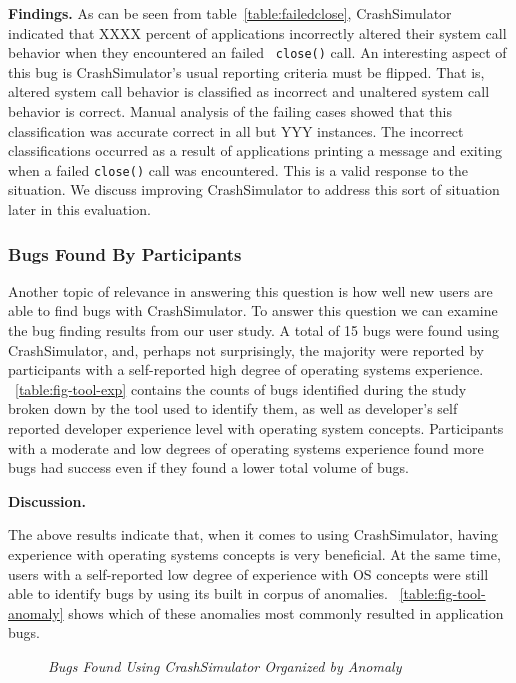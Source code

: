 {\bf Findings.} As can be seen from table~\ref{table:failedclose},
CrashSimulator indicated that XXXX percent of applications incorrectly
altered their system call behavior when they encountered an failed {\tt
close()} call.  An interesting aspect of this bug is CrashSimulator's usual
reporting criteria must be flipped.  That is, altered system call behavior
is classified as incorrect and unaltered system call behavior is correct.
Manual analysis of the failing cases showed that this classification was
accurate correct in all but YYY instances.  The incorrect classifications
occurred as a result of applications printing a message and exiting when a
failed {\tt close()} call was encountered.  This is a valid response to the
situation.  We discuss improving CrashSimulator to address this sort of
situation later in this evaluation.

\subsubsection{Bugs Found By Participants}

Another topic of relevance in answering this question is how well new users are
able to find bugs with CrashSimulator.
To answer this question we can examine the bug finding results from our user
study.
A total of 15 bugs were found using CrashSimulator, and, perhaps not
surprisingly, the majority were reported by participants with a
self-reported high degree of operating systems experience.
~\ref{table:fig-tool-exp} contains the
counts of bugs identified during the study broken down by
the tool used to identify them, as well as developer's self reported
developer experience level with operating system concepts.
Participants with a moderate and low degrees of operating
systems experience found more bugs had success even if they found a lower total
volume of bugs.

{\bf Discussion. }

The above results indicate that, when it comes to using CrashSimulator,
having experience with operating systems concepts is very beneficial.  At
the same time, users with a self-reported low degree of experience with OS
concepts were still able to identify bugs by using its built in corpus of
anomalies. ~\ref{table:fig-tool-anomaly} shows which
of these anomalies most commonly
resulted in application bugs.

\begin{figure}[t]
  \center{}
  \caption{\emph{Bugs Found Using CrashSimulator Organized by Anomaly}}
  \label{fig-tool-anomaly}
\end{figure}

